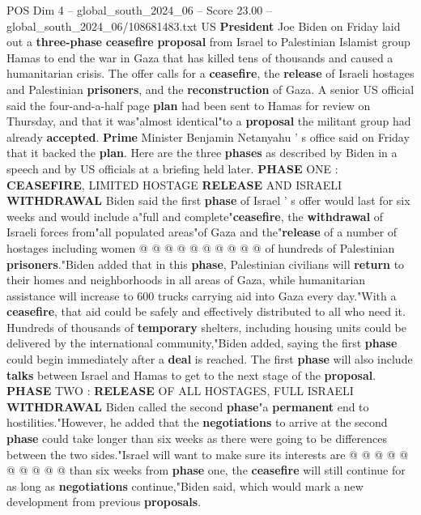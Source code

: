 \begin{textsample}{POS Dim 4 – global\_south\_2024\_06 – Score 23.00 – global\_south\_2024\_06/108681483.txt}  \label{ex:f4_pos_090}
US \textbf{President} Joe Biden on Friday laid out a \textbf{three-phase} \textbf{ceasefire} \textbf{proposal} from Israel to Palestinian Islamist group Hamas to end the war in Gaza that has killed tens of thousands and caused a humanitarian crisis.
The offer calls for a \textbf{ceasefire}, the \textbf{release} of Israeli hostages and Palestinian \textbf{prisoners}, and the \textbf{reconstruction} of Gaza.
A senior US official said the four-and-a-half page \textbf{plan} had been sent to Hamas for review on Thursday, and that it was"almost identical"to a \textbf{proposal} the militant group had already \textbf{accepted}. \textbf{Prime} Minister Benjamin Netanyahu ' s office said on Friday that it backed the \textbf{plan}.
Here are the three \textbf{phases} as described by Biden in a speech and by US officials at a briefing held later. \textbf{PHASE} ONE : \textbf{CEASEFIRE}, LIMITED HOSTAGE \textbf{RELEASE} AND ISRAELI \textbf{WITHDRAWAL} Biden said the first \textbf{phase} of Israel ' s offer would last for six weeks and would include a"full and complete"\textbf{ceasefire}, the \textbf{withdrawal} of Israeli forces from"all populated areas"of Gaza and the"\textbf{release} of a number of hostages including women @ @ @ @ @ @ @ @ @ @ of hundreds of Palestinian \textbf{prisoners}."Biden added that in this \textbf{phase}, Palestinian civilians will \textbf{return} to their homes and neighborhoods in all areas of Gaza, while humanitarian assistance will increase to 600 trucks carrying aid into Gaza every day."With a \textbf{ceasefire}, that aid could be safely and effectively distributed to all who need it.
Hundreds of thousands of \textbf{temporary} shelters, including housing units could be delivered by the international community,"Biden added, saying the first \textbf{phase} could begin immediately after a \textbf{deal} is reached.
The first \textbf{phase} will also include \textbf{talks} between Israel and Hamas to get to the next stage of the \textbf{proposal}. \textbf{PHASE} TWO : \textbf{RELEASE} OF ALL HOSTAGES, FULL ISRAELI \textbf{WITHDRAWAL} Biden called the second \textbf{phase}"a \textbf{permanent} end to hostilities."However, he added that the \textbf{negotiations} to arrive at the second \textbf{phase} could take longer than six weeks as there were going to be differences between the two sides."Israel will want to make sure its interests are @ @ @ @ @ @ @ @ @ @ than six weeks from \textbf{phase} one, the \textbf{ceasefire} will still continue for as long as \textbf{negotiations} continue,"Biden said, which would mark a new development from previous \textbf{proposals}.

\end{textsample}
